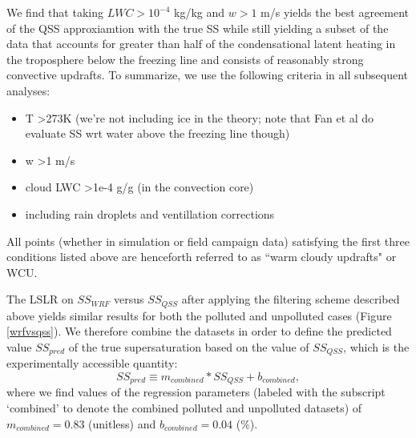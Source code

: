 \documentclass{article}
\begin{document}
We find that taking $LWC > 10^{-4}$ kg/kg and $w>1$ m/s yields the best agreement of the QSS approxiamtion with the true SS while still yielding a subset of the data that accounts for greater than half of the condensational latent heating in the troposphere below the freezing line and consists of reasonably strong convective updrafts. To summarize, we use the following criteria in all subsequent analyses:
\begin{itemize}
	\item T \textgreater  273K (we're not including ice in the theory; note that Fan et al do evaluate SS wrt water above the freezing line though)
	\item w \textgreater  1 m/s
	\item cloud LWC \textgreater  1e-4 g/g (in the convection core) 
	\item including rain droplets and ventillation corrections
\end{itemize}
All points (whether in simulation or field campaign data) satisfying the first three conditions listed above are henceforth referred to as ``warm cloudy updrafts" or WCU. 

The LSLR on $SS_{WRF}$ versus $SS_{QSS}$ after applying the filtering scheme described above yields similar results for both the polluted and unpolluted cases (Figure \ref{wrfvsqss}). We therefore combine the datasets in order to define the predicted value $SS_{pred}$ of the true supersaturation based on the value of $SS_{QSS}$, which is the experimentally accessible quantity:
\begin{equation}
\label{sspred}
SS_{pred} \equiv m_{combined}*SS_{QSS} + b_{combined},
\end{equation}
where we find values of the regression parameters (labeled with the subscript `combined' to denote the combined polluted and unpolluted datasets) of $m_{combined}=0.83$ (unitless) and $b_{combined}=0.04$ (\%).
\end{document}
